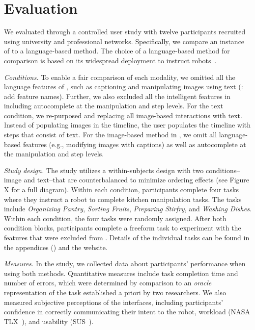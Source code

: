 \section{Evaluation}
We evaluated \projname through a controlled user study with twelve participants recruited using university and professional networks. Specifically, we compare an instance of \projname to a language-based method. The choice of a language-based method for comparison is based on its widespread deployment to instruct robots~\cite{team2024octo, zha2023distilling}.

\emph{Conditions.} To enable a fair comparison of each modality, we omitted all the language features of \projname, such as captioning and manipulating images using text (\mk: add feature names). Further, we also excluded all the intelligent features in \projname including autocomplete at the manipulation and step levels. For the text condition, we re-purposed \projname and replacing all image-based interactions with text. Instead of populating images in the timeline, the user populates the timeline with steps that consist of text. For the image-based method in \projname, we omit all language-based features (e.g., modifying images with captions) as well as autocomplete at the manipulation and step levels. 

\emph{Study design.} The study utilizes a within-subjects design with two conditions--image and text--that are counterbalanced to minimize ordering effects (see Figure X for a full diagram). Within each condition, participants complete four tasks where they instruct a robot to complete kitchen manipulation tasks. The tasks include \textit{Organizing Pantry}, \textit{Sorting Fruits}, \textit{Preparing Stirfry}, and \textit{Washing Dishes}. Within each condition, the four tasks were randomly assigned. After both condition blocks, participants complete a freeform task to experiment with the features that were excluded from \projname. Details of the individual tasks can be found in the appendices () and the website.



\emph{Measures.} In the study, we collected data about participants' performance when using both methods. Quantitative measures include task completion time and number of errors, which were determined by comparison to an \textit{oracle} representation of the task established a priori by two researchers. We also measured subjective perceptions of the interfaces, including participants' confidence in correctly communicating their intent to the robot, workload (NASA TLX~\cite{hart2006nasa}), and usability (SUS~\cite{bangor2008empirical}).

